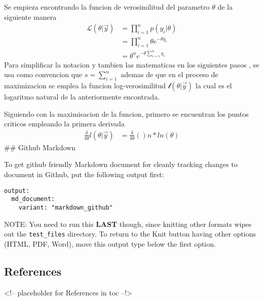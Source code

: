 \documentclass[
]{article}
\begin{document}
Se empieza encontrando la funcion de verosimilitud del parametro
\(\theta\) de la siguiente manera \[
\begin{split}
\mathcal{L}(\theta|\vec{y})&=\prod_{i=1}^np(y_i|\theta)\\
&=\prod_{i=1}^n\theta e^{-\theta y_i}\\
&=\theta^ne^{-\theta\sum_{i=1}^ny_i}
\end{split}
\] Para simplificar la notacion y tambien las matematicas en los
siguientes pasos , se usa como convencion que \(s=\sum_{i=1}^n\) ademas
de que en el proceso de maximizacion se emplea la funcion
log-verosimilitud \(\mathcal{l}(\theta|\vec{y})\) la cual es el
logaritmo natural de la anteriormente encontrada.

Siguiendo con la maximisacion de la funcion, primero se encuentran los
puntos criticos empleando la primera derivada \[
\begin{split}
\frac{\delta}{\delta\theta}l(\theta|\vec{y})&=\frac{\delta}{\delta \theta}\left( \right)n*ln(\theta)
\end{split}
\] \#\# Github Markdown

To get github friendly Markdown document for cleanly tracking changes to
document in Github, put the following output first:

\begin{verbatim}
output:
  md_document:
    variant: "markdown_github"
\end{verbatim}

NOTE: You need to run this \textbf{LAST} though, since knitting other
formats wipes out the \texttt{test\_files} directory. To return to the
Knit button having other options (HTML, PDF, Word), move this output
type below the first option.

\hypertarget{references}{%
\subsection*{References}\label{references}}

\textless!-- placeholder for References in toc --!\textgreater{}
\end{document}
